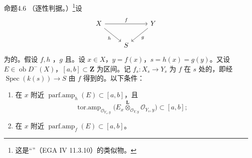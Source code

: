 \begin{SGAresult}{命题}{4.6}
（逐性判据。）\footnote{这是“”（EGA IV 11.3.10）的类似物。}设
\[
\begin{tikzcd}
X\arrow[rr,"f"]\arrow[dr,"h"']&&Y\arrow[dl,"g"]\\
&S&
\end{tikzcd}
\]
为的。假设 $f,h$ ，$g$ 且。设 $x\in X$，$y=f(x)$，$s=h(x)=g(y)$。又设 $E\in\operatorname{ob}D^-(X)$，$[a,b]\subset\mathbf Z$ 为区间。记 $f_s:X_s\to Y_s$ 为 $f$ 在 $s$ 处的，即经 $\operatorname{Spec}(k(s))\to S$ 由 $f$ 得到的。以下条件：
\begin{enumerate}
\item[(i)] 在 $x$ 附近 $\operatorname{parf.amp}_h(E)\subset[a,b]$，且
\[
\operatorname{tor.amp}_{\mathcal O_{Y_s,y}}
\bigl(E_x\mathbin{\overset{\mathbf L}{\otimes}}_{\mathcal O_{Y,y}}\mathcal O_{Y_s,y}\bigr)\subset[a,b];
\]
\item[(ii)] 在 $x$ 附近 $\operatorname{parf.amp}_f(E)\subset[a,b]$。
\end{enumerate}
\end{SGAresult}
